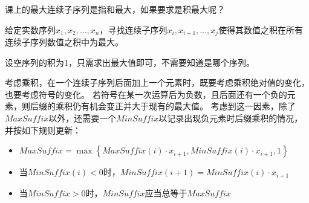 \documentclass[answers]{exam}
\begin{document}
\begin{questions}
    \newpage %

    \question 课上的最大连续子序列是指和最大，如果要求是积最大呢？

    {\kaishu
    给定实数序列$x_1, x_2, \dots, x_n$，寻找连续子序列$x_i, x_{i+1}, \dots, x_j$使得其数值之积在所有连续子序列数值之积中为最大。

    设空序列的积为1，只需求出最大值即可，不需要知道是哪个序列。
    }

    \begin{solution}
        考虑乘积，在一个连续子序列后面加上一个元素时，既要考虑乘积绝对值的变化，也要考虑符号的变化。
        若符号在某一次运算后为负数，且后面还有一个负的元素，则后缀的乘积仍有机会变正并大于现有的最大值。
        考虑到这一因素，除了$MaxSuffix$以外，还需要一个$MinSuffix$以记录出现负元素时后缀乘积的情况，并按如下规则更新：
        \begin{itemize}
            \item $MaxSuffix = \max{\left\{MaxSuffix(i) \cdot x_{i+1}, MinSuffix(i) \cdot x_{i+1}, 1\right\}}$
            \item 当$MinSuffix(i) < 0$时，$MinSuffix(i+1) = MinSuffix(i) \cdot x_{i+1}$
            \item 当$MinSuffix > 0$时，$MinSuffix$应当总等于$MaxSuffix$
        \end{itemize}


\end{solution}
\end{questions}
\end{document}
